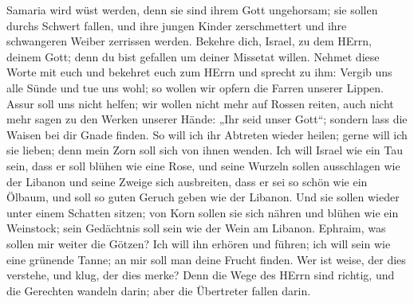  Samaria wird wüst werden, denn sie sind ihrem Gott
ungehorsam; sie sollen durchs Schwert fallen, und ihre jungen Kinder
zerschmettert und ihre schwangeren Weiber zerrissen werden. 
Bekehre dich, Israel, zu dem HErrn, deinem Gott; denn du bist gefallen
um deiner Missetat willen.  Nehmet diese Worte mit euch und
bekehret euch zum HErrn und sprecht zu ihm: Vergib uns alle Sünde und
tue uns wohl; so wollen wir opfern die Farren unserer Lippen.
 Assur soll uns nicht helfen; wir wollen nicht mehr auf
Rossen reiten, auch nicht mehr sagen zu den Werken unserer Hände: „Ihr
seid unser Gott``; sondern lass die Waisen bei dir Gnade finden.
 So will ich ihr Abtreten wieder heilen; gerne will ich sie
lieben; denn mein Zorn soll sich von ihnen wenden.  Ich will
Israel wie ein Tau sein, dass er soll blühen wie eine Rose, und seine
Wurzeln sollen ausschlagen wie der Libanon  und seine Zweige
sich ausbreiten, dass er sei so schön wie ein Ölbaum, und soll so guten
Geruch geben wie der Libanon.  Und sie sollen wieder unter
einem Schatten sitzen; von Korn sollen sie sich nähren und blühen wie
ein Weinstock; sein Gedächtnis soll sein wie der Wein am Libanon.
 Ephraim, was sollen mir weiter die Götzen? Ich will ihn
erhören und führen; ich will sein wie eine grünende Tanne; an mir soll
man deine Frucht finden.  Wer ist weise, der dies verstehe,
und klug, der dies merke? Denn die Wege des HErrn sind richtig, und die
Gerechten wandeln darin; aber die Übertreter fallen darin.
